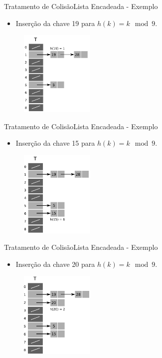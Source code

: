 \documentclass[aspectratio=169]{beamer}
\begin{document}
\begin{frame}{Tratamento de Colisão}{Lista Encadeada - Exemplo}
\begin{itemize}
 \item Inserção da chave 19 para $h(k) = k \mod 9$.
\end{itemize}
\begin{figure}[!h]
  \centering
  \includegraphics[width=100pt]{imagens/ex_encadeada4.png}
  \label{fig_ex_encadeada4}
\end{figure}
\end{frame}


\begin{frame}{Tratamento de Colisão}{Lista Encadeada - Exemplo}
\begin{itemize}
 \item Inserção da chave 15 para $h(k) = k \mod 9$.
\end{itemize}
\begin{figure}[!h]
  \centering
  \includegraphics[width=100pt]{imagens/ex_encadeada5.png}
  \label{fig_ex_encadeada5}
\end{figure}
\end{frame}

\begin{frame}{Tratamento de Colisão}{Lista Encadeada - Exemplo}
\begin{itemize}
 \item Inserção da chave 20 para $h(k) = k \mod 9$.
\end{itemize}
\begin{figure}[!h]
  \centering
  \includegraphics[width=100pt]{imagens/ex_encadeada6.png}
  \label{fig_ex_encadeada6}
\end{figure}
\end{frame}
\end{document}
